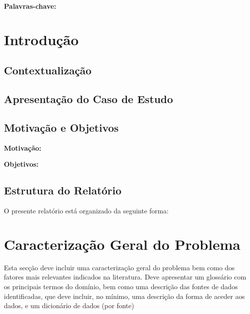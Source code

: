 \documentclass[11pt,a4paper]{report}
\begin{document}
\textbf{Palavras-chave:} 

\tableofcontents

\listoffigures

\listoftables

\lstlistoflistings

\printglossary[type=\acronymtype,title=Lista de Acrónimos]


\chapter{Introdução}
\cite{estg-website}

\section{Contextualização}

\section{Apresentação do Caso de Estudo}

\section{Motivação e Objetivos}

\textbf{Motivação:}


\textbf{Objetivos:}


\section{Estrutura do Relatório}

O presente relatório está organizado da seguinte forma:


\chapter{Caracterização Geral do Problema}

Esta secção deve
incluir uma caracterização geral do problema bem como dos fatores mais relevantes
indicados na literatura. Deve apresentar um glossário com os principais termos do
domínio, bem como uma descrição das fontes de dados identificadas, que deve incluir, no
mínimo, uma descrição da forma de aceder aos dados, e um dicionário de dados (por fonte)
\end{document}
